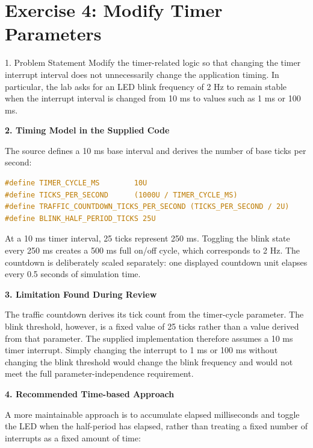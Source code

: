 \clearpage
\section*{Exercise 4: Modify Timer Parameters}

\begin{questionbox}{1. Problem Statement}
Modify the timer-related logic so that changing the timer interrupt interval does not unnecessarily change the application timing. In particular, the lab asks for an LED blink frequency of 2 Hz to remain stable when the interrupt interval is changed from 10 ms to values such as 1 ms or 100 ms.
\end{questionbox}

\vspace{0.4cm}
\textbf{2. Timing Model in the Supplied Code}

The source defines a 10 ms base interval and derives the number of base ticks per second:

\begin{lstlisting}[language=C, caption={Timer-related constants in main.c}, label={lst:exercise4_timer_constants}, captionpos=b]
#define TIMER_CYCLE_MS        10U
#define TICKS_PER_SECOND      (1000U / TIMER_CYCLE_MS)
#define TRAFFIC_COUNTDOWN_TICKS_PER_SECOND (TICKS_PER_SECOND / 2U)
#define BLINK_HALF_PERIOD_TICKS 25U
\end{lstlisting}

At a 10 ms timer interval, 25 ticks represent 250 ms. Toggling the blink state every 250 ms creates a 500 ms full on/off cycle, which corresponds to 2 Hz. The countdown is deliberately scaled separately: one displayed countdown unit elapses every 0.5 seconds of simulation time.

\textbf{3. Limitation Found During Review}

The traffic countdown derives its tick count from the timer-cycle parameter. The blink threshold, however, is a fixed value of 25 ticks rather than a value derived from that parameter. The supplied implementation therefore assumes a 10 ms timer interrupt. Simply changing the interrupt to 1 ms or 100 ms without changing the blink threshold would change the blink frequency and would not meet the full parameter-independence requirement.

\textbf{4. Recommended Time-based Approach}

A more maintainable approach is to accumulate elapsed milliseconds and toggle the LED when the half-period has elapsed, rather than treating a fixed number of interrupts as a fixed amount of time:

